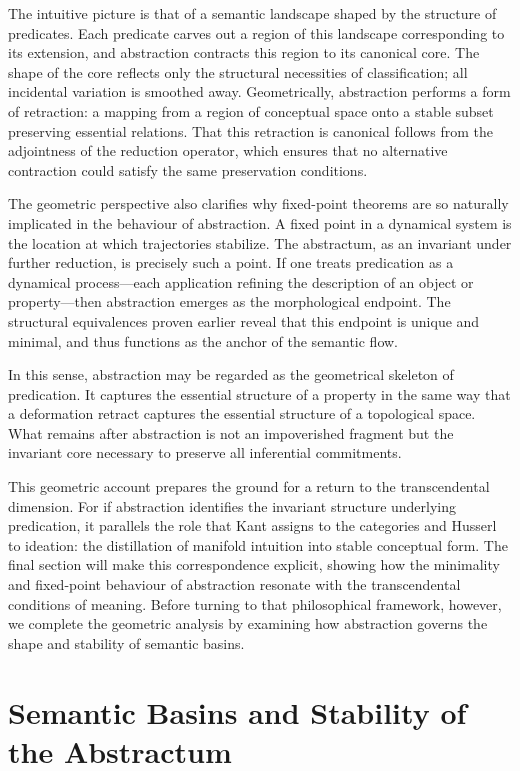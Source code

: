 \documentclass[12pt,letterpaper]{article}
\begin{document}
The intuitive picture is that of a semantic landscape shaped by the structure of predicates. Each predicate carves out a region of this landscape corresponding to its extension, and abstraction contracts this region to its canonical core. The shape of the core reflects only the structural necessities of classification; all incidental variation is smoothed away. Geometrically, abstraction performs a form of retraction: a mapping from a region of conceptual space onto a stable subset preserving essential relations. That this retraction is canonical follows from the adjointness of the reduction operator, which ensures that no alternative contraction could satisfy the same preservation conditions.

The geometric perspective also clarifies why fixed-point theorems are so naturally implicated in the behaviour of abstraction. A fixed point in a dynamical system is the location at which trajectories stabilize. The abstractum, as an invariant under further reduction, is precisely such a point. If one treats predication as a dynamical process—each application refining the description of an object or property—then abstraction emerges as the morphological endpoint. The structural equivalences proven earlier reveal that this endpoint is unique and minimal, and thus functions as the anchor of the semantic flow.

In this sense, abstraction may be regarded as the geometrical skeleton of predication. It captures the essential structure of a property in the same way that a deformation retract captures the essential structure of a topological space. What remains after abstraction is not an impoverished fragment but the invariant core necessary to preserve all inferential commitments.

This geometric account prepares the ground for a return to the transcendental dimension. For if abstraction identifies the invariant structure underlying predication, it parallels the role that Kant assigns to the categories and Husserl to ideation: the distillation of manifold intuition into stable conceptual form. The final section will make this correspondence explicit, showing how the minimality and fixed-point behaviour of abstraction resonate with the transcendental conditions of meaning. Before turning to that philosophical framework, however, we complete the geometric analysis by examining how abstraction governs the shape and stability of semantic basins.

\section{Semantic Basins and Stability of the Abstractum}
\end{document}

